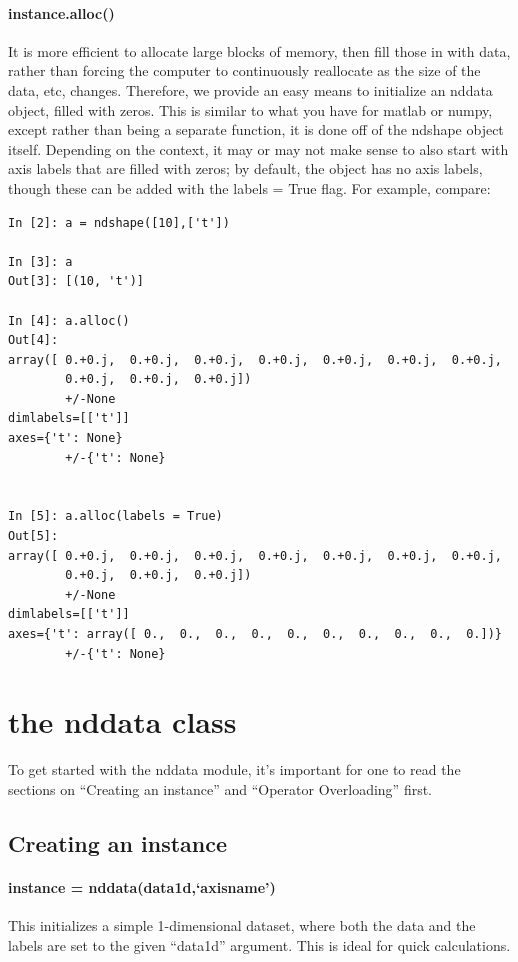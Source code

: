 \paragraph{instance.alloc()}
It is more efficient to allocate large blocks of memory, then fill those in with data, rather than forcing the computer to continuously reallocate as the size of the data, etc, changes.
Therefore, we provide an easy means to initialize an nddata object, filled with zeros.
This is similar to what you have for matlab or numpy, except rather than being a separate function, it is done off of the ndshape object itself.
Depending on the context, it may or may not make sense to also start with axis labels that are filled with zeros;
by default, the object has no axis labels, though these can be added with the labels = True flag.
For example, compare:
\begin{lstlisting}
In [2]: a = ndshape([10],['t'])

In [3]: a
Out[3]: [(10, 't')]

In [4]: a.alloc()
Out[4]:
array([ 0.+0.j,  0.+0.j,  0.+0.j,  0.+0.j,  0.+0.j,  0.+0.j,  0.+0.j,
        0.+0.j,  0.+0.j,  0.+0.j])
        +/-None
dimlabels=[['t']]
axes={'t': None}
        +/-{'t': None}


In [5]: a.alloc(labels = True)
Out[5]:
array([ 0.+0.j,  0.+0.j,  0.+0.j,  0.+0.j,  0.+0.j,  0.+0.j,  0.+0.j,
        0.+0.j,  0.+0.j,  0.+0.j])
        +/-None
dimlabels=[['t']]
axes={'t': array([ 0.,  0.,  0.,  0.,  0.,  0.,  0.,  0.,  0.,  0.])}
        +/-{'t': None}
\end{lstlisting}
\section{the nddata class}
To get started with the nddata module,
    it's important for one to read the sections on ``Creating an instance''
    and ``Operator Overloading'' first.
\subsection{Creating an instance}
\paragraph{instance = nddata(data1d,`axisname')}
This initializes a simple 1-dimensional dataset,
    where both the data and the labels are set to the given ``data1d'' argument.
This is ideal for quick calculations.
